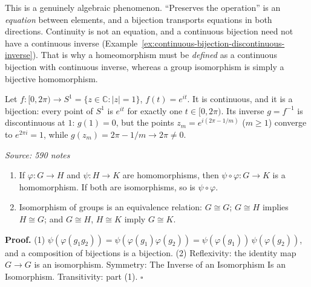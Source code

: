 \documentclass[11pt]{report}
\renewenvironment{proof}[1][Proof]{\noindent\textbf{#1.} }{\hfill$\square$\par\vspace{5pt}}
\newcommand{\srcline}[1]{\par\hfill{\footnotesize\textit{Source: #1}}}
\begin{document}
\begin{rembox}\label{rem:contrast-topology}
This is a genuinely algebraic phenomenon. ``Preserves the operation'' is an \emph{equation} between elements, and a bijection transports equations in both directions. Continuity is not an equation, and a continuous bijection need not have a continuous inverse (Example~\ref{ex:continuous-bijection-discontinuous-inverse}). That is why a homeomorphism must be \emph{defined} as a continuous bijection with continuous inverse, whereas a group isomorphism is simply a bijective homomorphism.
\end{rembox}

\begin{exbox}\label{ex:continuous-bijection-discontinuous-inverse}
Let $f \colon [0, 2\pi) \to S^1 = \{z \in \mathbb{C} : |z| = 1\}$, $f(t) = e^{it}$. It is continuous, and it is a bijection: every point of $S^1$ is $e^{it}$ for exactly one $t \in [0, 2\pi)$. Its inverse $g = f^{-1}$ is discontinuous at $1$: $g(1) = 0$, but the points $z_m = e^{i(2\pi - 1/m)}$ ($m \geq 1$) converge to $e^{2\pi i} = 1$, while $g(z_m) = 2\pi - 1/m \to 2\pi \neq 0$.
\srcline{590 notes}
\end{exbox}

\begin{propbox}\label{prop:composition-iso-equivalence-relation}
\begin{enumerate}
    \item If $\varphi: G \to H$ and $\psi: H \to K$ are homomorphisms, then $\psi \circ \varphi: G \to K$ is a homomorphism. If both are isomorphisms, so is $\psi \circ \varphi$.
    \item Isomorphism of groups is an equivalence relation: $G \cong G$; $G \cong H$ implies $H \cong G$; and $G \cong H$, $H \cong K$ imply $G \cong K$.
\end{enumerate}
\end{propbox}

\begin{proof}
(1) $\psi(\varphi(g_1 g_2)) = \psi(\varphi(g_1)\varphi(g_2)) = \psi(\varphi(g_1))\,\psi(\varphi(g_2))$, and a composition of bijections is a bijection. (2) Reflexivity: the identity map $G \to G$ is an isomorphism. Symmetry: The Inverse of an Isomorphism Is an Isomorphism. Transitivity: part (1).
\end{proof}
\end{document}
